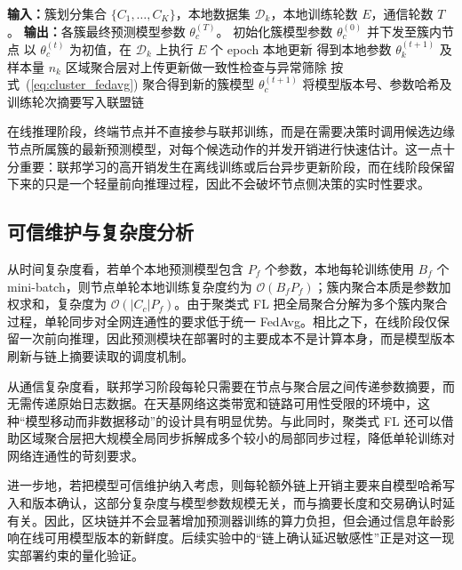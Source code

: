 \begin{algorithm}[H]
\caption{聚类式联邦学习（Clustered FedAvg）训练流程}
\label{alg:clusterfedavg}
\small
\begin{algorithmic}[1]
\Statex \textbf{输入：}簇划分集合 $\{C_1,\ldots,C_K\}$，本地数据集 $\mathcal{D}_k$，本地训练轮数 $E$，通信轮数 $T$。
\Statex \textbf{输出：}各簇最终预测模型参数 $\theta_c^{(T)}$。
    \State 初始化簇模型参数 $\theta_c^{(0)}$ 并下发至簇内节点
\EndFor
{}
            \State 以 $\theta_c^{(t)}$ 为初值，在 $\mathcal{D}_k$ 上执行 $E$ 个 epoch 本地更新
            \State 得到本地参数 $\theta_k^{(t+1)}$ 及样本量 $n_k$
        \EndFor
        \State 区域聚合层对上传更新做一致性检查与异常筛除
        \State 按式~(\ref{eq:cluster_fedavg}) 聚合得到新的簇模型 $\theta_c^{(t+1)}$
        \State 将模型版本号、参数哈希及训练轮次摘要写入联盟链
    \EndFor
\EndFor
\end{algorithmic}
\end{algorithm}

在线推理阶段，终端节点并不直接参与联邦训练，而是在需要决策时调用候选边缘节点所属簇的最新预测模型，对每个候选动作的并发开销进行快速估计。这一点十分重要：联邦学习的高开销发生在离线训练或后台异步更新阶段，而在线阶段保留下来的只是一个轻量前向推理过程，因此不会破坏节点侧决策的实时性要求。

\subsection{可信维护与复杂度分析}

从时间复杂度看，若单个本地预测模型包含 $P_f$ 个参数，本地每轮训练使用 $B_f$ 个 mini-batch，则节点单轮本地训练复杂度约为 $\mathcal{O}(B_f P_f)$；簇内聚合本质是参数加权求和，复杂度为 $\mathcal{O}(|C_c|P_f)$。由于聚类式 FL 把全局聚合分解为多个簇内聚合过程，单轮同步对全网连通性的要求低于统一 FedAvg。相比之下，在线阶段仅保留一次前向推理，因此预测模块在部署时的主要成本不是计算本身，而是模型版本刷新与链上摘要读取的调度机制。

从通信复杂度看，联邦学习阶段每轮只需要在节点与聚合层之间传递参数摘要，而无需传递原始日志数据。在天基网络这类带宽和链路可用性受限的环境中，这种“模型移动而非数据移动”的设计具有明显优势。与此同时，聚类式 FL 还可以借助区域聚合层把大规模全局同步拆解成多个较小的局部同步过程，降低单轮训练对网络连通性的苛刻要求。

进一步地，若把模型可信维护纳入考虑，则每轮额外链上开销主要来自模型哈希写入和版本确认，这部分复杂度与模型参数规模无关，而与摘要长度和交易确认时延有关。因此，区块链并不会显著增加预测器训练的算力负担，但会通过信息年龄影响在线可用模型版本的新鲜度。后续实验中的“链上确认延迟敏感性”正是对这一现实部署约束的量化验证。


